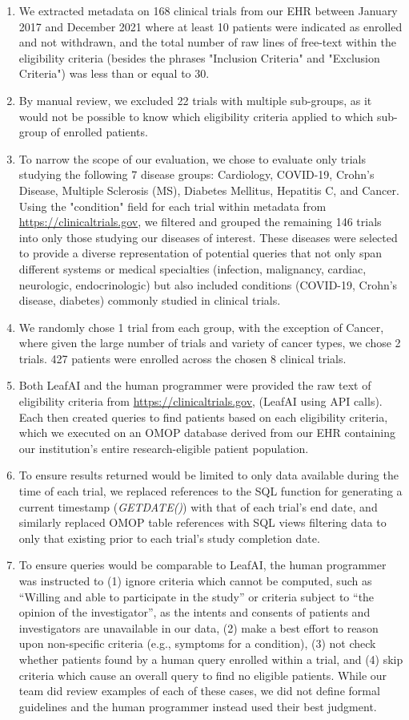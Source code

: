 \documentclass[../main.tex]{subfiles}
\begin{document}
\begin{enumerate}
    \item We extracted metadata on 168 clinical trials from our EHR between January 2017 and December 2021 where at least 10 patients were indicated as enrolled and not withdrawn, and the total number of raw lines of free-text within the eligibility criteria (besides the phrases "Inclusion Criteria" and "Exclusion Criteria") was less than or equal to 30.
    \item By manual review, we excluded 22 trials with multiple sub-groups, as it would not be possible to know which eligibility criteria applied to which sub-group of enrolled patients.
    \item To narrow the scope of our evaluation, we chose to evaluate only trials studying the following 7 disease groups: Cardiology, COVID-19, Crohn's Disease, Multiple Sclerosis (MS), Diabetes Mellitus, Hepatitis C, and Cancer. Using the "condition" field for each trial within metadata from \url{https://clinicaltrials.gov}, we filtered and grouped the remaining 146 trials into only those studying our diseases of interest. These diseases were selected to provide a diverse representation of potential queries that not only span different systems or medical specialties (infection, malignancy, cardiac, neurologic, endocrinologic) but also included conditions (COVID-19, Crohn’s disease, diabetes) commonly studied in clinical trials.
    \item We randomly chose 1 trial from each group, with the exception of Cancer, where given the large number of trials and variety of cancer types, we chose 2 trials. 427 patients were enrolled across the chosen 8 clinical trials.
    \item Both LeafAI and the human programmer were provided the raw text of eligibility criteria from \url{https://clinicaltrials.gov}, (LeafAI using API calls). Each then created queries to find patients based on each eligibility criteria, which we executed on an OMOP database derived from our EHR containing our institution’s entire research-eligible patient population.
    \item To ensure results returned would be limited to only data available during the time of each trial, we replaced references to the SQL function for generating a current timestamp (\textit{GETDATE()}) with that of each trial's end date, and similarly replaced OMOP table references with SQL views filtering data to only that existing prior to each trial's study completion date.
    \item To ensure queries would be comparable to LeafAI, the human programmer was instructed to (1) ignore criteria which cannot be computed, such as “Willing and able to participate in the study” or criteria subject to “the opinion of the investigator”, as the intents and consents of patients and investigators are unavailable in our data, (2) make a best effort to reason upon non-specific criteria (e.g., symptoms for a condition), (3) not check whether patients found by a human query enrolled within a trial, and (4) skip criteria which cause an overall query to find no eligible patients. While our team did review examples of each of these cases, we did not define formal guidelines and the human programmer instead used their best judgment.

\end{enumerate}
\end{document}
